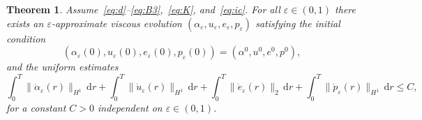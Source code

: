 \documentclass[reqno]{amsart}
\newtheorem{theorem}[corollary]{Theorem}
\theoremstyle{definition}
\numberwithin{equation}{section}
\def\de {\mathrm{d}}
\begin{document}
\begin{theorem}\label{thm:eap_vis_ev}
Assume~\eqref{eq:d}--\eqref{eq:B3},~\eqref{eq:K}, and~\eqref{eq:ic}. For all $\varepsilon\in(0,1)$ there exists an $\varepsilon$-approximate viscous evolution $(\alpha_\varepsilon,u_\varepsilon, e_\varepsilon, p_\varepsilon)$ satisfying the initial condition
\begin{equation}\label{eq:eps_ic}
(\alpha_\varepsilon(0),u_\varepsilon(0), e_\varepsilon(0), p_\varepsilon(0))=(\alpha^0,u^0,e^0,p^0),
\end{equation} 
and the uniform estimates
\begin{equation}\label{eq:0_est}
 \int_0^T\|\dot\alpha_\varepsilon(r)\|_{H^1} \,\de r+\int_0^T\|\dot u_\varepsilon(r)\|_{H^1} \,\de r+\int_0^T\|\dot e_\varepsilon(r)\|_2 \,\de r+\int_0^T\|\dot p_\varepsilon(r)\|_{H^1} \,\de r\le C,   
\end{equation}
for a constant $C>0$ independent on $\varepsilon\in(0,1)$. 
\end{theorem}
\end{document}
